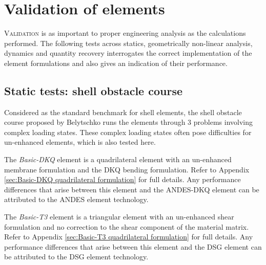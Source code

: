 


\chapter{Validation of elements}

\renewcommand{\Thema}{Validation of elements}

\lettrine[lines=2]{V}{alidation} is as important to proper engineering analysis as the calculations performed. The following tests across statics, geometrically non-linear analysis, dynamics and quantity recovery interrogates the correct implementation of the element formulations and also gives an indication of their performance. 

\section{Static tests: shell obstacle course}
\label{section:shell obstacle course}

Considered as the standard benchmark for shell elements, the shell obstacle course proposed by Belytschko \cite{Bel85} runs the elements through 3 problems involving complex loading states. These complex loading states often pose difficulties for un-enhanced elements, which is also tested here.

The \textit{Basic-DKQ} element is a quadrilateral element with an un-enhanced membrane formulation and the DKQ bending formulation. Refer to Appendix \ref{sec:Basic-DKQ quadrilateral formulation} for full details. Any performance differences that arise between this element and the ANDES-DKQ element can be attributed to the ANDES element technology.

The \textit{Basic-T3} element is a triangular element with an un-enhanced shear formulation and no correction to the shear component of the material matrix. Refer to Appendix \ref{sec:Basic-T3 quadrilateral formulation} for full details. Any performance differences that arise between this element and the DSG element can be attributed to the DSG element technology.

